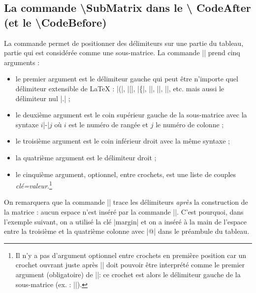 \documentclass[dvipsnames]{article}%
\begin{document}
\subsection{La commande \textbackslash SubMatrix dans le \textbackslash
  CodeAfter (et le \textbackslash CodeBefore)}

\label{sub-matrix}

La commande  permet de positionner des délimiteurs
sur une partie du tableau, partie qui est considérée comme une sous-matrice. La
commande |\SubMatrix| prend cinq arguments :
\begin{itemize}
\item le premier argument est le délimiteur gauche qui peut être n'importe
quel délimiteur extensible de LaTeX : |(|, |[|, |\{|, |\langle|, |\lgroup|,
|\lfloor|, etc. mais aussi le délimiteur nul |.| ;
\item le deuxième argument est le coin supérieur gauche de la sous-matrice avec
la syntaxe $i$|-|$j$ où $i$ est le numéro de rangée et $j$ le numéro de colonne
;
\item le troisième argument est le coin inférieur droit avec la même syntaxe ;
\item la quatrième argument est le délimiteur droit ;
\item le cinquième argument, optionnel, entre crochets, est une liste de couples
\textsl{clé=valeur}.\footnote{Il n'y a pas d'argument optionnel entre crochets en première
position car un crochet ouvrant juste après |\SubMatrix| doit pouvoir être
interprété comme le premier argument (obligatoire) de |\SubMatrix|: ce
crochet est alors le délimiteur gauche de la sous-matrice (ex. :
|\SubMatrix[{2-2}{4-7}]|).}
\end{itemize}

On remarquera que la commande |\SubMatrix| trace les délimiteurs \emph{après} la
construction de la matrice : aucun espace n'est inséré par la commande
|\SubMatrix|. C'est pourquoi, dans l'exemple suivant, on a utilisé la clé
|margin| et on a inséré à la main de l'espace entre la troisième et la quatrième
colonne avec |@{\hspace{1.5em}}| dans le préambule du tableau.
\end{document}
